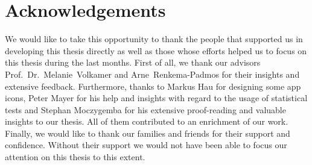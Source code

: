 \section*{Acknowledgements}

We would like to take this opportunity to thank the people that supported us in developing this thesis directly as well as those whose efforts helped us to focus on this thesis during the last months. First of all, we thank our advisors Prof.~Dr.~Melanie~Volkamer and Arne~Renkema-Padmos for their insights and extensive feedback.
Furthermore, thanks to Markus Hau for designing some app icons, Peter Mayer for his help and insights with regard to the usage of statistical tests and Stephan Moczygemba for his extensive proof-reading and valuable insights to our thesis. All of them contributed to an enrichment of our work.
Finally, we would like to thank our families and friends for their support and confidence. Without their support we would not have been able to focus our attention on this thesis to this extent.